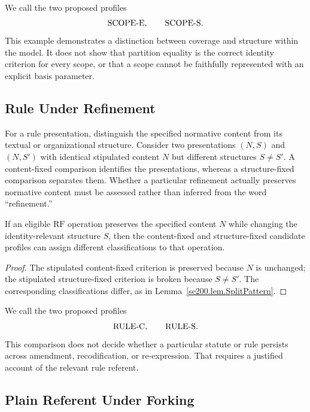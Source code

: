 We call the two proposed profiles
\[
  \mathrm{SCOPE\text{-}E},\qquad \mathrm{SCOPE\text{-}S}.
\]
This example demonstrates a distinction between coverage and
structure within the model.
It does not show that partition equality
is the correct identity criterion for every scope, or that a scope
cannot be faithfully represented with an explicit basis parameter.

\subsection{Rule Under Refinement}
\label{subsec:rule_split}

For a rule presentation, distinguish the specified normative content
from its textual or organizational structure.
Consider two
presentations $(N,S)$ and $(N,S')$ with identical stipulated content
$N$ but different structures $S\ne S'$.
A content-fixed comparison
identifies the presentations, whereas a structure-fixed comparison
separates them.
Whether a particular refinement actually preserves
normative content must be assessed rather than inferred from the word
``refinement.''

\begin{proposition}
  \label{se200.prop.RuleUnderdetermination}
  If an eligible $\mathrm{RF}$ operation preserves the specified
  content $N$ while changing the identity-relevant structure $S$,
  then the content-fixed and structure-fixed candidate profiles can
  assign different classifications to that operation.
\end{proposition}

\begin{proof}
  The stipulated content-fixed criterion is preserved because $N$
  is unchanged; the stipulated structure-fixed criterion is broken
  because $S\ne S'$.
  The corresponding classifications differ,
  as in Lemma~\ref{se200.lem.SplitPattern}.
\end{proof}

We call the two proposed profiles
\[
  \mathrm{RULE\text{-}C},\qquad \mathrm{RULE\text{-}S}.
\]
This comparison does not decide whether a particular statute or rule
persists across amendment, recodification, or re-expression.
That
requires a justified account of the relevant rule referent.

\subsection{Plain Referent Under Forking}
\label{subsec:plain_referent_split}


